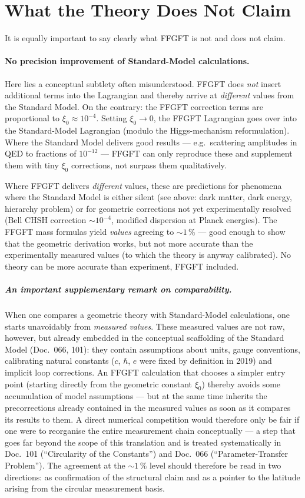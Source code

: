 \section{What the Theory Does Not Claim}

It is equally important to say clearly what FFGFT is not and does
not claim.

\paragraph{No precision improvement of Standard-Model calculations.}
Here lies a conceptual subtlety often misunderstood. FFGFT does
\emph{not} insert additional terms into the Lagrangian and thereby
arrive at \emph{different} values from the Standard Model. On the
contrary: the FFGFT correction terms are proportional to
$\xi_0 \approx 10^{-4}$. Setting $\xi_0 \to 0$, the FFGFT
Lagrangian goes over into the Standard-Model Lagrangian (modulo the
Higgs-mechanism reformulation). Where the Standard Model delivers
good results --- e.g.\ scattering amplitudes in QED to fractions
of $10^{-12}$ --- FFGFT can only reproduce these and supplement
them with tiny $\xi_0$ corrections, not surpass them qualitatively.

Where FFGFT delivers \emph{different} values, these are predictions
for phenomena where the Standard Model is either silent (see above:
dark matter, dark energy, hierarchy problem) or for geometric
corrections not yet experimentally resolved (Bell CHSH correction
$\sim 10^{-4}$, modified dispersion at Planck energies). The FFGFT
mass formulas yield \emph{values} agreeing to $\sim 1\,\%$ ---
good enough to show that the geometric derivation works, but not
more accurate than the experimentally measured values (to which
the theory is anyway calibrated). No theory can be more accurate
than experiment, FFGFT included.

\subparagraph{An important supplementary remark on comparability.}
When one compares a geometric theory with Standard-Model
calculations, one starts unavoidably from \emph{measured values}.
These measured values are not raw, however, but already embedded
in the conceptual scaffolding of the Standard Model (Doc.~066, 101):
they contain assumptions about units, gauge conventions, calibrating
natural constants ($c$, $\hbar$, $e$ were fixed by definition in
2019) and implicit loop corrections. An FFGFT calculation that
chooses a simpler entry point (starting directly from the geometric
constant $\xi_0$) thereby avoids some accumulation of model
assumptions --- but at the same time inherits the precorrections
already contained in the measured values as soon as it compares its
results to them. A direct numerical competition would therefore
only be fair if one were to reorganise the entire measurement chain
conceptually --- a step that goes far beyond the scope of this
translation and is treated systematically in Doc.~101
(\enquote{Circularity of the Constants}) and Doc.~066
(\enquote{Parameter-Transfer Problem}). The agreement at the
$\sim 1\,\%$ level should therefore be read in two directions: as
confirmation of the structural claim and as a pointer to the latitude
arising from the circular measurement basis.

